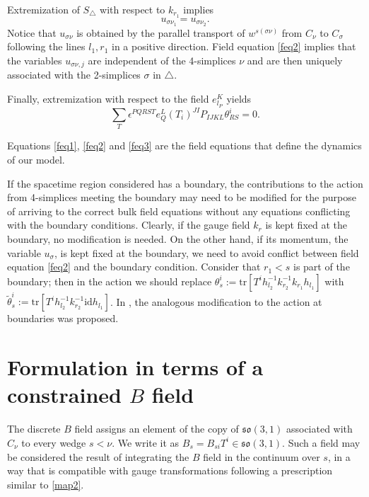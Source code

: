 \documentclass{article}
\begin{document}
Extremization of $S_{\triangle}$ with respect to $k_{r_1}$ implies 
\begin{equation}\label{feq2}
	u_{\sigma\nu_1}=u_{\sigma\nu_2} . 
\end{equation}	
Notice that $u_{\sigma\nu}$ is obtained by the parallel transport of $w^{s(\sigma\nu)}$ from $C_{\nu}$ to $C_{\sigma}$ following the lines $l_{1}, r_{1}$ in a positive direction. Field equation \eqref{feq2} implies that the variables $u_{\sigma\nu,j}$ are independent of the 4-simplices $\nu$ and are then uniquely associated with the 2-simplices $\sigma$ in $\triangle$. 

Finally, extremization with respect to the field $e_{l_P}^K$ yields
\begin{equation}\label{feq3}
	\sum_{T}\epsilon^{PQRST}e_{Q}^{L}\left(T_{i}\right)^{JI}P_{IJKL}\theta_{RS}^{i} = 0. 
\end{equation}

Equations \eqref{feq1}, \eqref{feq2} and \eqref{feq3} are the field equations that define the dynamics of our model. 

If the spacetime region considered has a boundary, the contributions to the action from 4-simplices meeting the boundary may need to be modified for the purpose of arriving to the correct bulk field equations without any equations conflicting with the boundary conditions. 
Clearly, if the gauge field $k_{r}$ is kept fixed at the boundary, no modification is needed. On the other hand, if its momentum, the variable $u_{\sigma}$, is kept fixed at the boundary, we need to avoid conflict between field equation \eqref{feq2} and the boundary condition. Consider that $r_1<s$ is part of the boundary; then in the action we should replace 
$\theta_{s}^{i}:=\text{tr}\left[T^{i} h_{l_2}^{-1}k_{r_{2}}^{-1}k_{r_1}h_{l_1} \right]$ with 
$\tilde{\theta}_{s}^{i}:=\text{tr}\left[T^{i} h_{l_2}^{-1}k_{r_{2}}^{-1} \text{id} h_{l_1} \right]$. In \cite{Rei1}, the analogous modification to the action at boundaries was proposed. 




\section{Formulation in terms of a constrained $B$ field}%
\label{B}


The discrete $B$ field assigns an element of the copy of $\mathfrak{so}(3,1)$ associated with $C_\nu$ to every wedge $s<\nu$. We write it as $B_s = B_{si} T^i \in \mathfrak{so}(3,1)$. 
Such a field may be considered the result of integrating the $B$ field in the continuum over $s$, in a way that is compatible with gauge transformations following a prescription similar to \eqref{map2}. 
\end{document}
